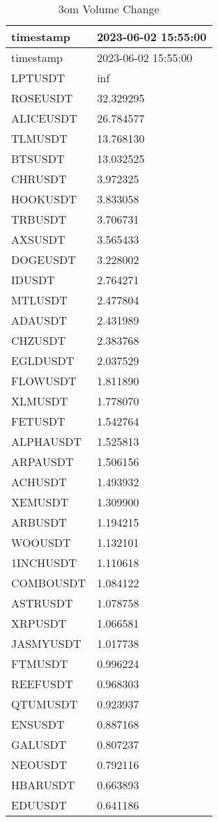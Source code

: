 \documentclass[
  letterpaper,
  DIV=11,
  numbers=noendperiod]{scrartcl}
\begin{document}
\begin{longtable}[]{@{}ll@{}}
\caption{3om Volume Change}\label{T_900fb}\tabularnewline
\toprule()
timestamp & 2023-06-02 15:55:00 \\
\midrule()
\endfirsthead
\toprule()
timestamp & 2023-06-02 15:55:00 \\
\midrule()
\endhead
LPTUSDT & inf \\
ROSEUSDT & 32.329295 \\
ALICEUSDT & 26.784577 \\
TLMUSDT & 13.768130 \\
BTSUSDT & 13.032525 \\
CHRUSDT & 3.972325 \\
HOOKUSDT & 3.833058 \\
TRBUSDT & 3.706731 \\
AXSUSDT & 3.565433 \\
DOGEUSDT & 3.228002 \\
IDUSDT & 2.764271 \\
MTLUSDT & 2.477804 \\
ADAUSDT & 2.431989 \\
CHZUSDT & 2.383768 \\
EGLDUSDT & 2.037529 \\
FLOWUSDT & 1.811890 \\
XLMUSDT & 1.778070 \\
FETUSDT & 1.542764 \\
ALPHAUSDT & 1.525813 \\
ARPAUSDT & 1.506156 \\
ACHUSDT & 1.493932 \\
XEMUSDT & 1.309900 \\
ARBUSDT & 1.194215 \\
WOOUSDT & 1.132101 \\
1INCHUSDT & 1.110618 \\
COMBOUSDT & 1.084122 \\
ASTRUSDT & 1.078758 \\
XRPUSDT & 1.066581 \\
JASMYUSDT & 1.017738 \\
FTMUSDT & 0.996224 \\
REEFUSDT & 0.968303 \\
QTUMUSDT & 0.923937 \\
ENSUSDT & 0.887168 \\
GALUSDT & 0.807237 \\
NEOUSDT & 0.792116 \\
HBARUSDT & 0.663893 \\
EDUUSDT & 0.641186 \\

\end{longtable}
\end{document}

